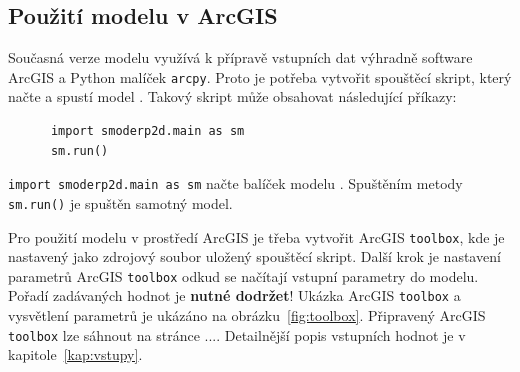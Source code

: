 \subsection{Použití modelu v ArcGIS}
  
  Současná verze modelu \smod využívá k přípravě vstupních dat výhradně software ArcGIS a Python malíček {\tt arcpy}. Proto je potřeba vytvořit spouštěcí skript, který načte a spustí model \smod. Takový skript může obsahovat následující příkazy:
    \begin{lstlisting}
      import smoderp2d.main as sm
      sm.run()
    \end{lstlisting}
  {\tt import smoderp2d.main as sm}  načte balíček modelu \smod. Spuštěním metody  {\tt sm.run()} je spuštěn samotný model. 
  
  Pro použití modelu v prostředí ArcGIS je třeba vytvořit ArcGIS {\tt toolbox}, kde je nastavený jako zdrojový soubor  uložený spouštěcí skript. Další krok je nastavení parametrů ArcGIS {\tt toolbox} odkud se načítají vstupní parametry do modelu. Pořadí zadávaných hodnot je {\bf nutné dodržet}! Ukázka ArcGIS {\tt toolbox} a vysvětlení parametrů je ukázáno na obrázku~\ref{fig:toolbox}. Připravený ArcGIS {\tt toolbox} lze sáhnout na stránce .... Detailnější popis vstupních hodnot je v kapitole~\ref{kap:vstupy}.
  
  
  
